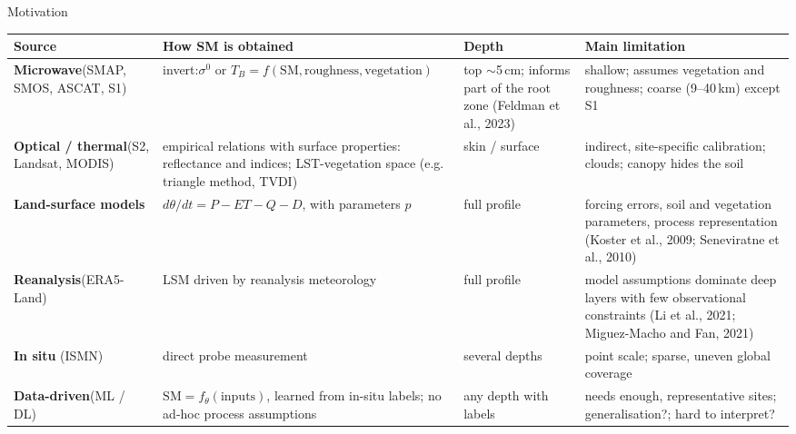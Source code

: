 \providecommand{\figcap}[1]{\par\vspace{1pt}{\scriptsize\itshape #1}\par}
\providecommand{\msg}[1]{\par\vspace{5pt}\begin{beamercolorbox}[wd=0.94\linewidth,sep=5pt,center,rounded=true]{msgbox}\small\textbf{#1}\end{beamercolorbox}}
\begin{frame}{Motivation}
\scriptsize
\centering
\renewcommand{\arraystretch}{1.25}
\begin{tabular}{@{}p{} p{} p{} p{}@{}}
\toprule
Source & How SM is obtained & Depth & Main limitation \\
\midrule
\textbf{Microwave}\newline (SMAP, SMOS, ASCAT, S1)
  & invert:\newline $\sigma^0$ or $T_B = f(\mathrm{SM}, \text{roughness}, \text{vegetation})$
  & top $\sim$5\,cm; informs part of the root zone (Feldman et al., 2023)
  & shallow; assumes vegetation and roughness; coarse (9--40\,km) except S1 \\
\addlinespace[7pt]
\textbf{Optical / thermal}\newline (S2, Landsat, MODIS)
  & empirical relations with surface properties: reflectance and indices; LST-vegetation space (e.g. triangle method, TVDI)
  & skin / surface
  & indirect, site-specific calibration; clouds; canopy hides the soil \\
\addlinespace[7pt]
\textbf{Land-surface models}
  & $d\theta/dt = P - ET - Q - D$, with parameters $p$
  & full profile
  & forcing errors, soil and vegetation parameters, process representation (Koster et al., 2009; Seneviratne et al., 2010) \\
\addlinespace[7pt]
\textbf{Reanalysis}\newline (ERA5-Land)
  & LSM driven by reanalysis meteorology
  & full profile
  & model assumptions dominate deep layers with few observational constraints (Li et al., 2021; Miguez-Macho and Fan, 2021) \\
\addlinespace[7pt]
\textbf{In situ} (ISMN)
  & direct probe measurement
  & several depths
  & point scale; sparse, uneven global coverage \\
\addlinespace[7pt]
\textbf{Data-driven}\newline (ML / DL)
  & $\mathrm{SM} = f_\theta(\text{inputs})$, learned from in-situ labels; no ad-hoc process assumptions
  & any depth with labels
  & needs enough, representative sites; generalisation?; hard to interpret? \\
\bottomrule
\end{tabular}
\end{frame}

